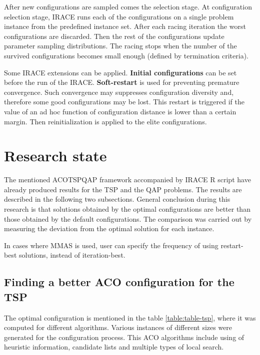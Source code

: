 \documentclass[12pt]{article}
\begin{document}
After new configurations are sampled comes the selection stage. At configuration selection stage, IRACE runs each of the configurations on a single problem instance from the predefined instance set. After each racing iteration the worst configurations are discarded. Then the rest of the configurations update parameter sampling distributions. The racing stops when the number of the survived configurations becomes small enough (defined by termination criteria).

Some IRACE extensions can be applied. \textbf{Initial configurations} can be set before the run of the IRACE. \textbf{Soft-restart} is used for preventing premature convergence. Such convergence may suppresses configuration diversity and, therefore some good configurations may be lost. This restart is triggered if the value of an ad hoc function of configuration distance is lower than a certain margin. Then reinitialization is applied to the elite configurations.


\section{Research state}

The mentioned ACOTSPQAP framework accompanied by IRACE R script have already produced results for the TSP and the QAP problems. The results are described in the following two subsections. General conclusion during this research is that solutions obtained by the optimal configurations are better than those obtained by the default configurations. The comparison was carried out by measuring the deviation from the optimal solution for each instance.

In cases where MMAS is used, user can specify the frequency of using restart-best solutions, instead of iteration-best.

\subsection{Finding a better ACO configuration for the TSP}

The optimal configuration is mentioned in the table \ref{table:table-tsp}, where it was computed for different algorithms. Various instances of different sizes were generated for the configuration process. This ACO algorithms include using of heuristic information, candidate lists and multiple types of local search.
\end{document}
